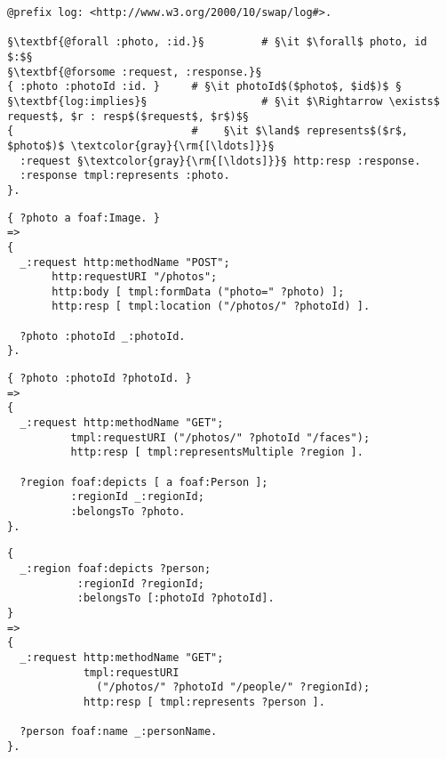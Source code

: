 \documentclass[runningheads,a4paper, twocolumn]{llncs}
\begin{document}
\begin{lstlisting}[caption=\autoref{lst:PhotoGet} with explicit quantifiers,
                   label=lst:PhotoGetQuantifiers, float, escapechar=§]
@prefix log: <http://www.w3.org/2000/10/swap/log#>.

§\textbf{@forall :photo, :id.}§         # §\it $\forall$ photo, id $:$§
§\textbf{@forsome :request, :response.}§
{ :photo :photoId :id. }     # §\it photoId$($photo$, $id$)$ §
§\textbf{log:implies}§                  # §\it $\Rightarrow \exists$ request$, $r : resp$($request$, $r$)$§
{                            #    §\it $\land$ represents$($r$, $photo$)$ \textcolor{gray}{\rm{[\ldots]}}§
  :request §\textcolor{gray}{\rm{[\ldots]}}§ http:resp :response.
  :response tmpl:represents :photo.
}.
\end{lstlisting}

\begin{lstlisting}[caption=RESTdesc description of photo upload,
                   label=lst:PhotoUpload, float, escapechar=§]
{ ?photo a foaf:Image. }
=>
{
  _:request http:methodName "POST";
       http:requestURI "/photos";
       http:body [ tmpl:formData ("photo=" ?photo) ];
       http:resp [ tmpl:location ("/photos/" ?photoId) ].

  ?photo :photoId _:photoId.
}.
\end{lstlisting}

\begin{lstlisting}[caption=RESTdesc description of face detection,
                   label=lst:FaceDetection, float, escapechar=§]
{ ?photo :photoId ?photoId. }
=>
{
  _:request http:methodName "GET";
          tmpl:requestURI ("/photos/" ?photoId "/faces");
          http:resp [ tmpl:representsMultiple ?region ].
  
  ?region foaf:depicts [ a foaf:Person ];
          :regionId _:regionId;
          :belongsTo ?photo.
}.
\end{lstlisting}

\begin{lstlisting}[caption=RESTdesc description of face recognition,
                   label=lst:FaceRecognition, float, escapechar=§, belowskip=-1em]
{
  _:region foaf:depicts ?person;
           :regionId ?regionId;
           :belongsTo [:photoId ?photoId].
}
=>
{
  _:request http:methodName "GET";
            tmpl:requestURI
              ("/photos/" ?photoId "/people/" ?regionId);
            http:resp [ tmpl:represents ?person ].
  
  ?person foaf:name _:personName.
}.
\end{lstlisting}
\end{document}
